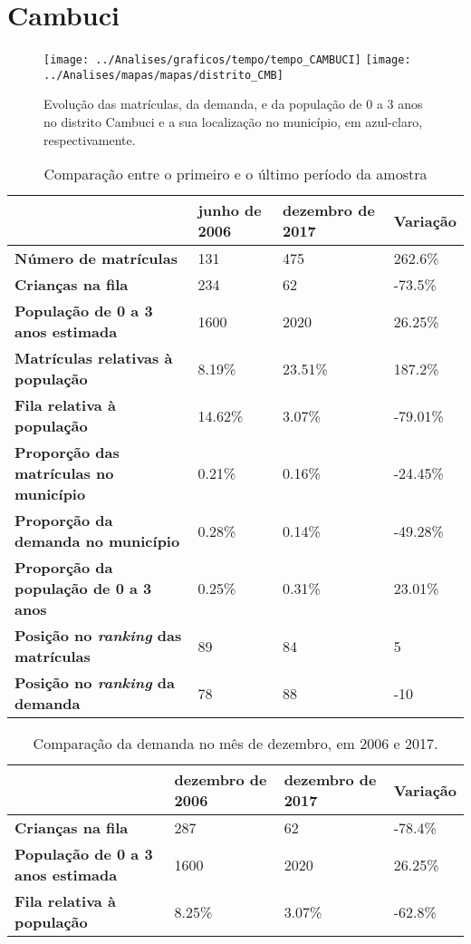 \section{Cambuci}
\begin{figure}[H]
\centering
\texttt{[image: ../Analises/graficos/tempo/tempo\_CAMBUCI]}
\texttt{[image: ../Analises/mapas/mapas/distrito\_CMB]}
\caption{Evolução das matrículas, da demanda, e da população de 0 a 3 anos no distrito Cambuci e a sua localização no município, em azul-claro, respectivamente.}
\end{figure}
\begin{table}[H]
\begin{tabular}{l|l|l|l}
\textbf{}                                      & \textbf{junho de 2006}       & \textbf{dezembro de 2017}    & \textbf{Variação} \\ \hline
\textbf{Número de matrículas}                  & 131 & 475 & 262.6\% \\ \hline
\textbf{Crianças na fila}                      & 234 & 62 & -73.5\% \\ \hline
\textbf{População de 0 a 3 anos estimada}      & 1600 & 2020 & 26.25\% \\ \hline
\textbf{Matrículas relativas à população}      & 8.19\% & 23.51\% & 187.2\% \\ \hline
\textbf{Fila relativa à população}             & 14.62\% & 3.07\% & -79.01\% \\ \hline
\textbf{Proporção das matrículas no município} & 0.21\% & 0.16\% & -24.45\% \\ \hline
\textbf{Proporção da demanda no município}     & 0.28\% & 0.14\% & -49.28\% \\ \hline
\textbf{Proporção da população de 0 a 3 anos}  & 0.25\% & 0.31\% & 23.01\% \\ \hline
\textbf{Posição no \textit{ranking} das matrículas}     & 89 & 84 & 5 \\ \hline
\textbf{Posição no \textit{ranking} da demanda}         & 78 & 88 & -10 \\ 
\end{tabular}
\caption{Comparação entre o primeiro e o último período da amostra}
\end{table}
\begin{table}[H]
\begin{tabular}{l|l|l|l}
\textbf{}                                 & \textbf{dezembro de 2006} & \textbf{dezembro de 2017} & \textbf{Variação} \\ \hline
\textbf{Crianças na fila}                      & 287 & 62 & -78.4\% \\ \hline
\textbf{População de 0 a 3 anos estimada}      & 1600 & 2020 & 26.25\% \\ \hline
\textbf{Fila relativa à população}             & 8.25\% & 3.07\% & -62.8\% \\
\end{tabular}
\caption{Comparação da demanda no mês de dezembro, em 2006 e 2017.}
\end{table}
